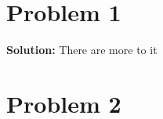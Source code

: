 \documentclass[a4paper]{article}
\begin{document}
\tableofcontents
\clearpage
\section{Problem 1}
\textbf{Solution:} There are more to it
\clearpage
\section{Problem 2} 
\end{document}
